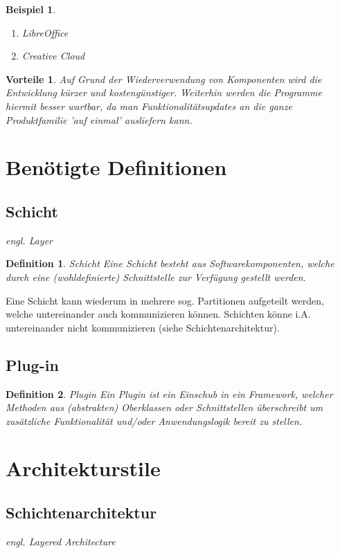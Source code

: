 \documentclass[a4paper]{article}
\theoremstyle{break}
\newtheorem{defi}{Definition}[section]
\newtheorem{ex}{Beispiel}[section]
\newtheorem{why}{Vorteile}[section]
\begin{document}
\begin{ex}
	\begin{enumerate}
		\item LibreOffice
		\item Creative Cloud
	\end{enumerate}
\end{ex}

\begin{why}
	Auf Grund der Wiederverwendung von Komponenten wird die Entwicklung kürzer und kostengünstiger. Weiterhin werden die Programme hiermit besser wartbar, da man Funktionalitätsupdates an die ganze Produktfamilie 'auf einmal' ausliefern kann.
\end{why}
\newpage
\section{Benötigte Definitionen}
\subsection{Schicht}

\textit{engl. Layer}
\begin{defi}{Schicht}
	Eine Schicht besteht aus Softwarekomponenten, welche durch eine (wohldefinierte) Schnittstelle zur Verfügung gestellt werden.
\end{defi}

Eine Schicht kann wiederum in mehrere sog. Partitionen aufgeteilt werden, welche untereinander auch kommunizieren können. Schichten könne i.A. untereinander nicht kommunizieren (siehe Schichtenarchitektur).

\subsection{Plug-in}
\begin{defi}{Plugin}
	Ein Plugin ist ein Einschub in ein Framework, welcher Methoden aus (abstrakten) Oberklassen oder Schnittstellen überschreibt um zusätzliche Funktionalität und/oder Anwendungslogik bereit zu stellen.
\end{defi}
\section{Architekturstile}
\subsection{Schichtenarchitektur}
\textit{engl. Layered Architecture}
\end{document}
